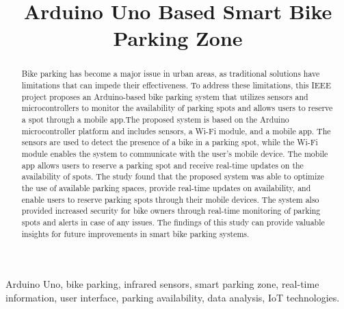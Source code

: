 \documentclass[conference]{IEEEtran}
\begin{document}
	
	\title{Arduino Uno Based Smart Bike Parking Zone\\
		

	}
	
	\author{ 
		\and
	}
	
	\maketitle
	
	\begin{abstract}
	Bike parking has become a major issue in urban areas, as traditional solutions have limitations that can impede their effectiveness. To address these limitations, this IEEE project proposes an Arduino-based bike parking system that utilizes sensors and microcontrollers to monitor the availability of parking spots and allows users to reserve a spot through a mobile app.The proposed system is based on the Arduino microcontroller platform and includes sensors, a Wi-Fi module, and a mobile app. The sensors are used to detect the presence of a bike in a parking spot, while the Wi-Fi module enables the system to communicate with the user's mobile device. The mobile app allows users to reserve a parking spot and receive real-time updates on the availability of spots.	The study found that the proposed system was able to optimize the use of available parking spaces, provide real-time updates on availability, and enable users to reserve parking spots through their mobile devices. The system also provided increased security for bike owners through real-time monitoring of parking spots and alerts in case of any issues. The findings of this study can provide valuable insights for future improvements in smart bike parking systems.
	\end{abstract}
	
	\begin{IEEEkeywords}
		Arduino Uno, bike parking, infrared sensors, smart parking zone, real-time information, user interface, parking availability, data analysis, IoT technologies.
	\end{IEEEkeywords}
	
\end{document}
